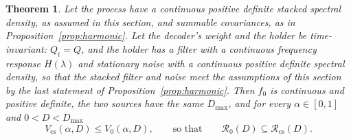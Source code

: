\documentclass[11pt,onecolumn]{IEEEtran}
\newtheorem{theorem}{Theorem}
\begin{document}
\begin{theorem}\label{thm:averaged}
Let the process have a continuous positive definite stacked spectral
density, as assumed in this section, and summable covariances, as in
Proposition~\ref{prop:harmonic}. Let the decoder's weight and the
holder be time-invariant: $Q_t=Q$, and the holder has a filter with a
continuous frequency response $H(\lambda)$ and stationary noise with a
continuous positive definite spectral density, so that the stacked
filter and noise meet the assumptions of this section by the last
statement of Proposition~\ref{prop:harmonic}. Then $f_0$ is
continuous and positive definite, the two sources have the same
$D_{\max}$, and for every $\alpha\in[0,1]$ and $0<D<D_{\max}$
\[
V_{\mathrm{cs}}(\alpha,D)\le V_0(\alpha,D),\qquad\text{so that}\qquad
\mathcal R_0(D)\subseteq\mathcal R_{\mathrm{cs}}(D).
\]
\end{theorem}
\end{document}
